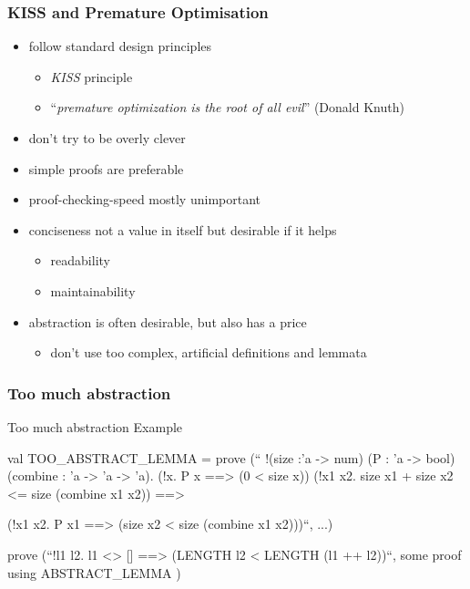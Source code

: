 \begin{frame}
\frametitle{KISS and Premature Optimisation}

\begin{itemize}
\item follow standard design principles
\begin{itemize}
\item \emph{KISS} principle
\item ``\emph{premature optimization is the root of all evil}'' (Donald Knuth)
\end{itemize}
\item don't try to be overly clever
\item simple proofs are preferable
\item proof-checking-speed mostly unimportant
\item conciseness not a value in itself but desirable if it helps
\begin{itemize}
\item readability
\item maintainability
\end{itemize}
\item abstraction is often desirable, but also has a price
\begin{itemize}
\item don't use too complex, artificial definitions and lemmata
\end{itemize}
\end{itemize}
\end{frame}


\begin{frame}[fragile]
\frametitle{Too much abstraction}

\begin{alertblock}{Too much abstraction Example}
\begin{semiverbatim}\scriptsize
val TOO_ABSTRACT_LEMMA = prove (``
!(size :'a -> num) (P : 'a -> bool) (combine : 'a -> 'a -> 'a).
  (!x. P x ==> (0 < size x)) \holAnd{}
  (!x1 x2. size x1 + size x2 <= size (combine x1 x2)) ==>

  (!x1 x2. P x1 ==> (size x2 < size (combine x1 x2)))``,
...)


prove (``!l1 l2. l1 <> [] ==> (LENGTH l2 < LENGTH (l1 ++ l2))``,
  \textrm{some proof using} ABSTRACT_LEMMA
)
\end{semiverbatim}
\end{alertblock}

\end{frame}


